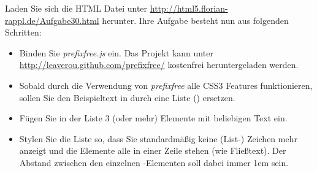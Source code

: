 %
\par Laden Sie sich die HTML Datei unter
\url{http://html5.florian-rappl.de/Aufgabe30.html} herunter. Ihre Aufgabe
besteht nun aus folgenden Schritten:
%
\begin{itemize}
\item 
Binden Sie \emph{prefixfree.js} ein. Das Projekt kann unter
\url{http://leaverou.github.com/prefixfree/} kostenfrei heruntergeladen werden.
\item 
Sobald durch die Verwendung von \emph{prefixfree} alle CSS3 Features
funktionieren, sollen Sie den Beispieltext in  durch eine Liste
() ersetzen.
\item
Fügen Sie in der Liste 3 (oder mehr)  Elemente mit beliebigen Text
ein.
\item
Stylen Sie die Liste so, dass Sie standardmäßig keine (List-) Zeichen mehr
anzeigt und die Elemente alle in einer Zeile stehen (wie Fließtext). Der
Abstand zwischen den einzelnen -Elementen soll dabei immer 1em sein.
\end{itemize}